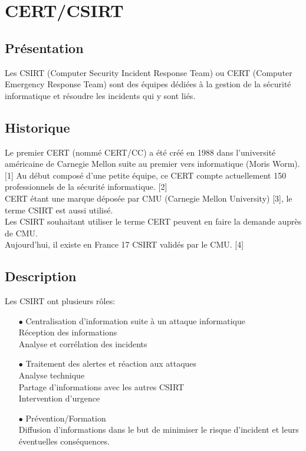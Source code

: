 \section{CERT/CSIRT}
\thispagestyle{plain}
\subsection{Présentation}
Les CSIRT (Computer Security Incident Response Team) ou CERT (Computer Emergency Response Team) sont des équipes dédiées à la gestion de la sécurité informatique et résoudre les incidents qui y sont liés.

\subsection{Historique}
Le premier CERT (nommé CERT/CC)  a été créé en 1988 dans l’université américaine de Carnegie Mellon suite au premier vers informatique (Moris Worm). [1]
Au début composé d’une petite équipe, ce CERT compte actuellement 150 professionnels de la sécurité informatique. [2]\\

CERT étant une marque déposée par CMU (Carnegie Mellon University) [3], le terme CSIRT est aussi utilisé.\\

Les CSIRT souhaitant utiliser le terme CERT peuvent en faire la demande auprès de CMU.\\
Aujourd’hui, il existe en France 17 CSIRT validés par le CMU. [4]\\

\subsection{Description}
Les CSIRT ont plusieurs rôles:
\begin{itemize}
\item [$\bullet$] Centralisation d’information suite à un attaque informatique\\
\subitem [$\bullet$] Réception des informations\\
\subitem [$\bullet$] Analyse et corrélation des incidents\\
\item [$\bullet$] Traitement des alertes et réaction aux attaques\\
\subitem [$\bullet$] Analyse technique\\
\subitem [$\bullet$] Partage d’informations avec les autres CSIRT\\
\subitem [$\bullet$] Intervention d’urgence\\
\item [$\bullet$] Prévention/Formation\\
\subitem [$\bullet$] Diffusion d’informations dans le but de minimiser le risque d’incident et leurs éventuelles conséquences.\\
\end{itemize}
